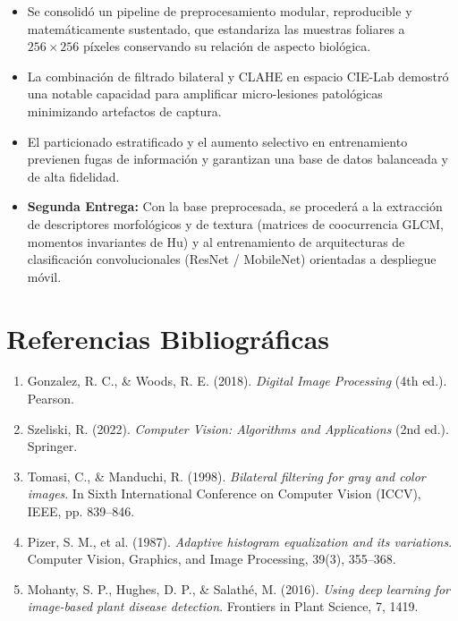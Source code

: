 \documentclass[12pt,a4paper]{article}
\begin{document}
\begin{itemize}
    \item Se consolidó un pipeline de preprocesamiento modular, reproducible y matemáticamente sustentado, que estandariza las muestras foliares a $256 \times 256$ píxeles conservando su relación de aspecto biológica.
    \item La combinación de filtrado bilateral y CLAHE en espacio CIE-Lab demostró una notable capacidad para amplificar micro-lesiones patológicas minimizando artefactos de captura.
    \item El particionado estratificado y el aumento selectivo en entrenamiento previenen fugas de información y garantizan una base de datos balanceada y de alta fidelidad.
    \item \textbf{Segunda Entrega:} Con la base preprocesada, se procederá a la extracción de descriptores morfológicos y de textura (matrices de coocurrencia GLCM, momentos invariantes de Hu) y al entrenamiento de arquitecturas de clasificación convolucionales (ResNet / MobileNet) orientadas a despliegue móvil.
\end{itemize}

\section*{Referencias Bibliográficas}
\begin{enumerate}
    \item Gonzalez, R. C., \& Woods, R. E. (2018). \textit{Digital Image Processing} (4th ed.). Pearson.
    \item Szeliski, R. (2022). \textit{Computer Vision: Algorithms and Applications} (2nd ed.). Springer.
    \item Tomasi, C., \& Manduchi, R. (1998). \textit{Bilateral filtering for gray and color images}. In Sixth International Conference on Computer Vision (ICCV), IEEE, pp. 839--846.
    \item Pizer, S. M., et al. (1987). \textit{Adaptive histogram equalization and its variations}. Computer Vision, Graphics, and Image Processing, 39(3), 355--368.
    \item Mohanty, S. P., Hughes, D. P., \& Salathé, M. (2016). \textit{Using deep learning for image-based plant disease detection}. Frontiers in Plant Science, 7, 1419.
\end{enumerate}
\end{document}
